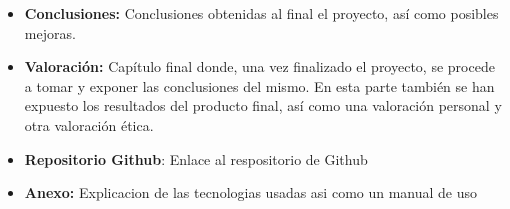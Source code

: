 \begin{itemize}
    \item \textbf{ Conclusiones: }
    Conclusiones obtenidas al final el proyecto, así como posibles mejoras.
    \item\textbf{Valoración:}
Capítulo final donde, una vez finalizado el proyecto, se procede a tomar y exponer las
conclusiones del mismo. En esta parte también se han expuesto los resultados del producto final, así como una valoración personal y otra valoración ética.
\item\textbf{Repositorio Github}:
Enlace al respositorio de Github

\item\textbf{Anexo:}
Explicacion de las tecnologias usadas asi como un manual de uso
    
\end{itemize}
